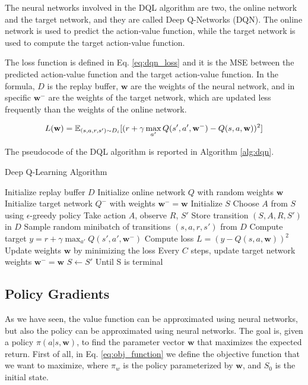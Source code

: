 The neural networks involved in the DQL algorithm are two, the online network and the target network, and they are called Deep Q-Networks (DQN).
The online network is used to predict the action-value function, while the target network is used to compute the target action-value function.

The loss function is defined in Eq. \ref{eq:dqn_loss} and it is the MSE between the predicted action-value function and the target action-value function.
In the formula, $D$ is the replay buffer, $\textbf{w}$ are the weights of the neural network, and in specific $\textbf{w}^-$ are the weights of the target network, which are updated less frequently than the weights of the online network.


\begin{equation} \label{eq:dqn_loss}
    L(\textbf{w}) = \operatorname{\mathbb{E}}_{(s, a, r, s') \sim D_i} [(r + \gamma \max_{a'} Q(s', a', \textbf{w}^-) - Q(s, a, \textbf{w}))^2]
\end{equation}

The pseudocode of the DQL algorithm is reported in Algorithm \ref{alg:dqn}.

\begin{algorithm}
\caption{Deep Q-Learning Algorithm}\label{alg:dqn}
\begin{algorithmic}
\State Initialize replay buffer $D$
\State Initialize online network $Q$ with random weights $\textbf{w}$
\State Initialize target network $Q^-$ with weights $\textbf{w}^- = \textbf{w}$
    \State Initialize $S$
        \State Choose $A$ from $S$ using $\epsilon$-greedy policy
        \State Take action $A$, observe $R$, $S'$
        \State Store transition $(S, A, R, S')$ in $D$
        \State Sample random minibatch of transitions $(s, a, r, s')$ from $D$
        \State Compute target $y = r + \gamma \max_{a'} Q(s', a', \textbf{w}^-)$
        \State Compute loss $L = (y - Q(s, a, \textbf{w}))^2$
        \State Update weights $\textbf{w}$ by minimizing the loss
        \State Every $C$ steps, update target network weights $\textbf{w}^- = \textbf{w}$
        \State $S \leftarrow S'$
    \EndFor
\State Until S is terminal
\EndFor
\end{algorithmic}
\end{algorithm}





\subsection{Policy Gradients}\label{subsec:policy_gradients}
As we have seen, the value function can be approximated using neural networks, but also the policy can be approximated using neural networks.
The goal is, given a policy $\pi(a|s, \textbf{w})$, to find the parameter vector $\textbf{w}$ that maximizes the expected return.
First of all, in Eq. \ref{eq:obj_function} we define the objective function that we want to maximize, where $\pi_w$ is the policy parameterized by $\textbf{w}$, and $S_0$ is the initial state.

